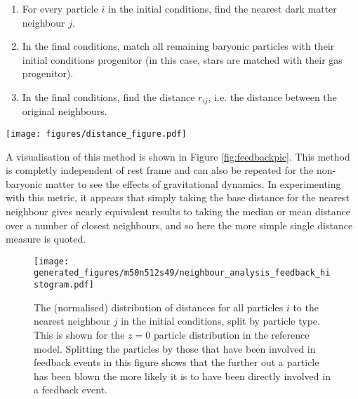\begin{enumerate}
	\item For every particle $i$ in the initial conditions, find the nearest
		  dark matter neighbour $j$.
	\item In the final conditions, match all remaining baryonic particles
	      with their initial conditions progenitor (in this case, stars are
	      matched with their gas progenitor).
	\item In the final conditions, find the distance $r_{ij}$, i.e. the
	      distance between the original neighbours.
\end{enumerate}

\begin{figure*}
    \centering
    \texttt{[image: figures/distance\_figure.pdf]}
    \caption{The large-scale structure of the 50 Mpc reference model is shown.
    The background gray colour-map shows the projected column density of the
    gas in the simulation. Over-plotted is 1/250th of all gas particles
    in the simulation, coloured and sized by their distance travelled
    according to the metric below. Note how the low-distance particles
    are those that are trapped in the potential wells of the galaxies
    and clusters present in the simulations, with the particles that
    have travelled farther compared to their dark matter counterpart
    residing, in general, outside of any bound system.}
    \label{fig:feedbackpic}
\end{figure*}

A visualisation of this method is shown in Figure \ref{fig:feedbackpic}.
This method is completly independent of rest frame and can also be repeated
for the non-baryonic matter to see the effects of gravitational dynamics. In
experimenting with this metric, it appears that simply taking the base
distance for the nearest neighbour gives nearly equivalent results to taking
the median or mean distance over a number of closest neighbours, and so here
the more simple single distance measure is quoted.

\begin{figure}
	\centering
    \texttt{[image: generated\_figures/m50n512s49/neighbour\_analysis\_feedback\_histogram.pdf]}
    \caption{
        The (normalised) distribution of distances for all particles $i$ to
        the nearest neighbour $j$ in the initial conditions, split by particle
        type. This is shown for the $z=0$ particle distribution in the
        reference model. Splitting the particles by those that have been
        involved in feedback events in this figure shows that the further
        out a particle has been blown the more likely it is to have been
        directly involved in a feedback event.
    }
    \label{fig:feedbackdistance}
\end{figure}

